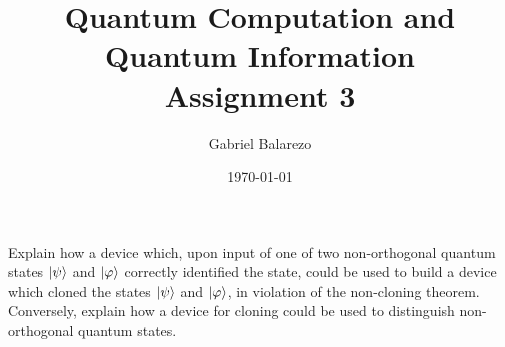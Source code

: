 \documentclass[12 pt]{article}
\title{Quantum Computation and Quantum Information\\
Assignment 3}
\author{Gabriel Balarezo}
\date{\today}
\begin{document}
\maketitle

\begin{mdframed}[backgroundcolor = gray!30,
  frametitle = Exercise 1.2]
  Explain how a device which, upon input of one of two non-orthogonal quantum states $\ket{\psi}$ and $\ket{\varphi}$ correctly identified the state, could be used to build a device which cloned the states $\ket{\psi}$ and $\ket{\varphi}$, in violation of the non-cloning theorem. Conversely, explain how a device for cloning could be used to distinguish non-orthogonal quantum states.
\end{mdframed}
\end{document}
